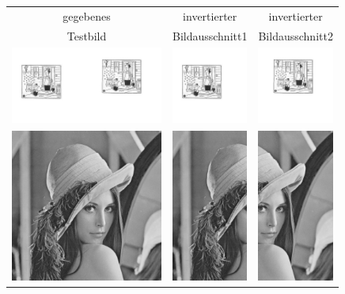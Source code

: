 \documentclass[12pt,german]{article}
\begin{document}
\begin{table}[H]
  \centering
  \begin{tabular}{| c | c | c |}
	\hline
	gegebenes & invertierter & invertierter \\	
	Testbild & Bildausschnitt1 & Bildausschnitt2 \\ 
    \hline
    \includegraphics[width=5cm]{images/chop/binary1.jpg} &
    \includegraphics[width=2.5cm]{images/chop/binary1FH.jpg} &
    \includegraphics[width=2.5cm]{images/chop/binary1SH.jpg} \\
    \hline
    \includegraphics[width=5cm]{images/chop/lena.jpg} &
    \includegraphics[width=2.5cm]{images/chop/lenaFH.jpg} &
    \includegraphics[width=2.5cm]{images/chop/lenaSH.jpg} \\
    \hline
    

\end{tabular}
\end{table}
\end{document}
